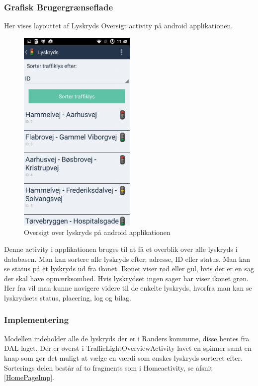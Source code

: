 \pagebreak

\subsubsection{Grafisk Brugergrænseflade}
Her vises layouttet af Lyskryds Oversigt activity på android applikationen.\\	
\begin{figure} [!ht]
	\begin{center}
		\includegraphics[height=10cm]{Android/Billeder/AndroidLyskryds}
	\end{center}
	\caption{Oversigt over lyskryds på android applikationen}
	\label{fig:Oversigt over lyskryds på android applikationen}
\end{figure}

\noindent Denne activity i applikationen bruges til at få et overblik over alle lyskryds i databasen. Man kan sortere alle lyskryds efter; adresse, ID eller status. Man kan se status på et lyskryds ud fra ikonet. Ikonet viser rød eller gul, hvis der er en sag der skal have opmærksomhed. Hvis lyskrydset ingen sager har viser ikonet grøn.\\
Her fra vil man kunne navigere videre til de enkelte lyskryds, hvorfra man kan se lyskrydsets status, placering, log og bilag.

\subsubsection{Implementering}
Modellen indeholder alle de lyskryds der er i Randers kommune, disse hentes fra DAL-laget.
Der er øverst i TrafficLightOverviewActivity lavet en spinner samt en knap som gør det muligt at vælge en værdi som ønskes lyskryds sorteret efter.
Sorterings delen består af to fragments som i Homeactivity, se afsnit \vref{HomePageImp}.


